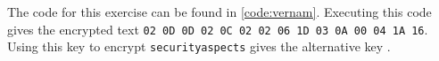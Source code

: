 
The code for this exercise can be found in \autoref{code:vernam}. Executing this code gives the encrypted text \texttt{02 0D 0D 02 0C 02 02 06 1D 03 0A 00 04 1A 16}. Using this key to encrypt \texttt{securityaspects} gives the alternative key .

